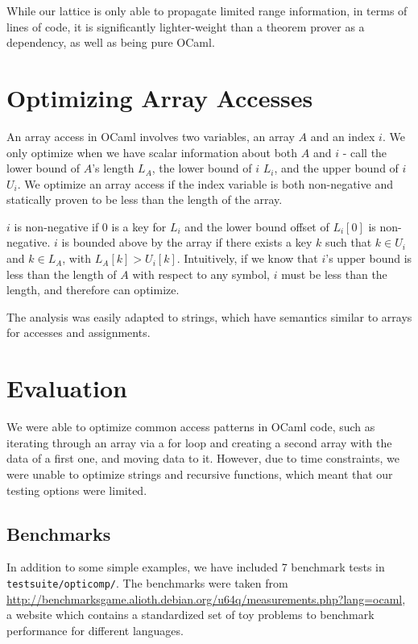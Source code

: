 \documentclass[11pt]{article}
\begin{document}
While our lattice is only able to propagate limited range information, in terms of lines of code, it is significantly lighter-weight than a theorem prover as a dependency, as well as being pure OCaml.

\section{Optimizing Array Accesses}

An array access in OCaml involves two variables, an array $A$ and an index $i$. We only optimize when we have scalar information about both $A$ and $i$ - call the lower bound of $A$'s length $L_A$, the lower bound of $i$ $L_i$, and the upper bound of $i$ $U_i$. We optimize an array access if the index variable is both non-negative and statically proven to be less than the length of the array.

$i$ is non-negative if $0$ is a key for $L_i$ and the lower bound offset of $L_i[0]$ is non-negative. $i$ is bounded above by the array if there exists a key $k$ such that $k \in U_i$ and $k \in L_A$, with $L_A[k] > U_i[k]$. Intuitively, if we know that $i$'s upper bound is less than the length of $A$ with respect to any symbol, $i$ must be less than the length, and therefore can optimize.

The analysis was easily adapted to strings, which have semantics similar to
arrays for accesses and assignments.


\section{Evaluation}


We were able to optimize common access patterns in OCaml code, such as iterating through an array via a for loop and creating a second array with the data of a first one, and moving data to it. However, due to time constraints, we were unable to optimize strings and recursive functions, which meant that our testing options were limited.

\subsection{Benchmarks}

In addition to some simple examples, we have included 7 benchmark tests in \verb|testsuite/opticomp/|. The benchmarks were taken from \url{http://benchmarksgame.alioth.debian.org/u64q/measurements.php?lang=ocaml}, a website which contains a standardized set of toy problems to benchmark performance for different languages.
\end{document}
